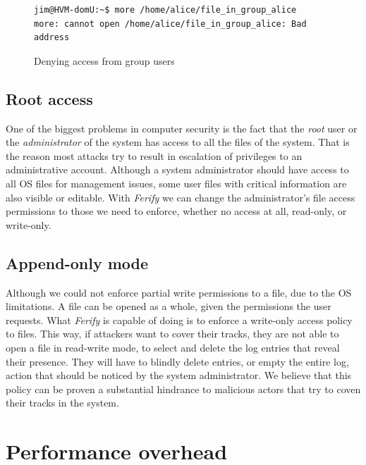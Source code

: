 \begin{figure}[ht]
	\centering
	\scriptsize{\selectfont 
		\begin{lstlisting}
jim@HVM-domU:~$ more /home/alice/file_in_group_alice
more: cannot open /home/alice/file_in_group_alice: Bad address
		\end{lstlisting}}
	\caption{Denying access from group users}
	\label{fig:group_deny}
\end{figure}

\subsection{Root access}

\par One of the biggest problems in computer security is the fact that the \emph{root} user or the \emph{administrator} of the system has access to all the files of the system. That is the reason most attacks try to result in escalation of privileges to an administrative account. Although a system administrator should have access to all \ac{OS} files for management issues, some user files with critical information are also visible or editable. With \emph{Ferify} we can change the administrator's file access permissions to those we need to enforce, whether no access at all, read-only, or write-only.


\subsection{Append-only mode}

\par Although we could not enforce partial write permissions to a file, due to the \ac{OS} limitations. A file can be opened as a whole, given the permissions the user requests. What \emph{Ferify} is capable of doing is to enforce a write-only access policy to files. This way, if attackers want to cover their tracks, they are not able to open a file in read-write mode, to select and delete the log entries that reveal their presence. They will have to blindly delete entries, or empty the entire log, action that should be noticed by the system administrator. We believe that this policy can be proven a substantial hindrance to malicious actors that try to coven their tracks in the system.

\section{Performance overhead}\label{sec:performance}

